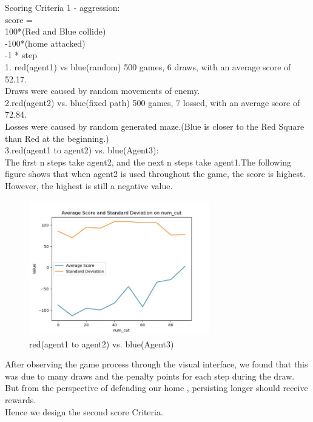 \documentclass{article}
\begin{document}
Scoring Criteria 1 - aggression:\\
score =\\
100*(Red and Blue collide)\\
-100*(home attacked)\\
-1 * step \\

1. red(agent1) vs blue(random)
500 games, 6 draws, with an average score of 52.17.\\
Draws were caused by random movements of enemy.\\

2.red(agent2) vs. blue(fixed path)
500 games, 7 lossed, with an average score of 72.84.\\
Losses were caused by random generated maze.(Blue is closer to the Red Square than Red at the beginning.)\\

3.red(agent1 to agent2) vs. blue(Agent3):\\
The first n steps take agent2, and the next n steps take agent1.The following figure shows that when agent2 is used throughout the game, the score is highest. However, the highest is still a negative value.\\
	\begin{figure}[H]
	\centering
	\includegraphics[width=0.7\textwidth]{r1.png}
	\caption{red(agent1 to agent2) vs. blue(Agent3)}
	\end{figure} 

After observing the game process through the visual interface, we found that this was due to many draws and the penalty points for each step during the draw.\\
But from the perspective of defending our home , persisting longer should receive rewards.\\
Hence we design the second score Criteria.\\
\end{document}
